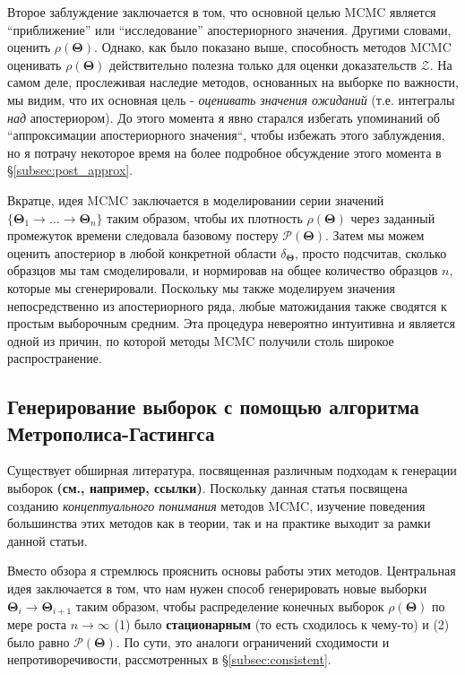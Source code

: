 \documentclass[12pt, titlepage]{article}
\newcommand{\params}{\ensuremath{\boldsymbol\Theta}}
\newcommand{\posterior}{\ensuremath{\mathcal{P}}}
\newcommand{\evidence}{\ensuremath{\mathcal{Z}}}
\begin{document}
Второе заблуждение заключается в том, что основной целью MCMC является ``приближение'' или ``исследование'' апостериорного значения. Другими словами, оценить $\rho(\params)$. Однако, как было показано выше, способность методов MCMC оценивать $\rho(\params)$ действительно полезна только для оценки доказательств $\evidence$. На самом деле, прослеживая наследие методов, основанных на выборке по важности, мы видим, что их основная цель - \textit{оценивать значения ожиданий} (т.е. интегралы \textit{над} апостериором). До этого момента я явно старался избегать упоминаний об ``аппроксимации апостериорного значения``, чтобы избежать этого заблуждения, но я потрачу некоторое время на более подробное обсуждение этого момента в \S\ref{subsec:post_approx}.

Вкратце, идея MCMC заключается в моделировании серии значений $\{ \params_1 \rightarrow \dots \rightarrow \params_n \}$ таким образом, чтобы их плотность $\rho(\params)$ через заданный промежуток времени следовала базовому постеру $\posterior(\params)$. Затем мы можем оценить апостериор в любой конкретной области $\delta_{\params}$, просто подсчитав, сколько образцов мы там смоделировали, и нормировав на общее количество образцов $n$, которые мы сгенерировали. Поскольку мы также моделируем значения непосредственно из апостериорного ряда, любые матожидания также сводятся к простым выборочным средним. Эта процедура невероятно интуитивна и является одной из причин, по которой методы MCMC получили столь широкое распространение.

\subsection{Генерирование выборок с помощью алгоритма Метрополиса-Гастингса} \label{subsec:mh}

Существует обширная литература, посвященная различным подходам к генерации выборок \textbf{(см., например, ссылки)}. Поскольку данная статья посвящена созданию \textit{концептуального понимания} методов MCMC, изучение поведения большинства этих методов как в теории, так и на практике выходит за рамки данной статьи.

Вместо обзора я стремлюсь прояснить основы работы этих методов. Центральная идея заключается в том, что нам нужен способ генерировать новые выборки $\params_i \rightarrow \params_{i+1}$ таким образом, чтобы распределение конечных выборок $\rho(\params)$ по мере роста $n \rightarrow \infty$ (1) было \textbf{стационарным} (то есть сходилось к чему-то) и (2) было равно $\posterior(\params)$. По сути, это аналоги ограничений сходимости и непротиворечивости, рассмотренных в \S\ref{subsec:consistent}.
\end{document}
